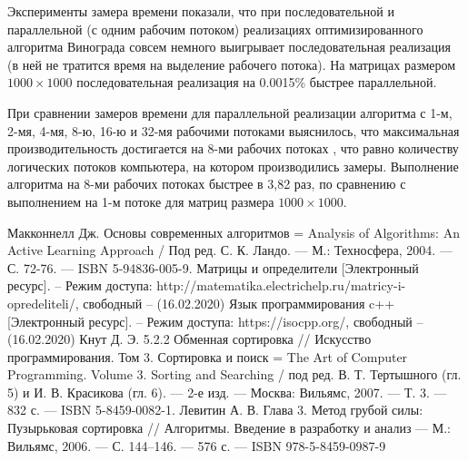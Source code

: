 \documentclass[a4paper,14pt]{article}
\begin{document}
       Эксперименты замера времени показали, что при последовательной и параллельной (с одним рабочим потоком) реализациях оптимизированного алгоритма Винограда совсем немного выигрывает последовательная реализация (в ней не тратится время на выделение рабочего потока). На матрицах размером $1000 \times 1000$ последовательная реализация на 0.0015\% быстрее параллельной.
       
        При сравнении замеров времени для параллельной реализации алгоритма с 1-м, 2-мя, 4-мя, 8-ю, 16-ю и 32-мя рабочими потоками выяснилось, что максимальная производительность достигается на 8-ми рабочих потоках , что равно количеству логических потоков компьютера, на котором производились замеры. Выполнение алгоритма на 8-ми рабочих потоках быстрее в 3,82 раз, по сравнению с выполнением на 1-м потоке для матриц размера $1000 \times 1000$.



\pagebreak
{}
\begin{thebibliography}{4}
 Макконнелл Дж. Основы современных алгоритмов = Analysis of Algorithms: An Active Learning Approach / Под ред. С. К. Ландо. — М.: Техносфера, 2004. — С. 72-76. — ISBN 5-94836-005-9.
Матрицы и определители [Электронный ресурс]. – Режим доступа: http://matematika.electrichelp.ru/matricy-i-opredeliteli/, свободный – (16.02.2020)
Язык программирования c++ [Электронный ресурс]. – Режим доступа: https://isocpp.org/, свободный – (16.02.2020)
 Кнут Д. Э. 5.2.2 Обменная сортировка // Искусство программирования. Том 3. Сортировка и поиск = The Art of Computer Programming. Volume 3. Sorting and Searching / под ред. В. Т. Тертышного (гл. 5) и И. В. Красикова (гл. 6). — 2-е изд. — Москва: Вильямс, 2007. — Т. 3. — 832 с. — ISBN 5-8459-0082-1.
 Левитин А. В. Глава 3. Метод грубой силы: Пузырьковая сортировка // Алгоритмы. Введение в разработку и анализ — М.: Вильямс, 2006. — С. 144–146. — 576 с. — ISBN 978-5-8459-0987-9


\end{thebibliography}
\end{document}
